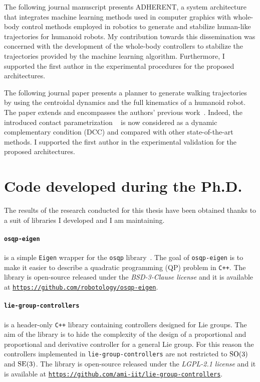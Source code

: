 The following journal manuscript presents ADHERENT, a system architecture that integrates machine learning methods used in computer graphics with whole-body control methods employed in robotics to generate and stabilize human-like trajectories for humanoid robots. My contribution towards this dissemination was concerned with the development of the whole-body controllers to stabilize the trajectories provided by the machine learning algorithm. Furthermore, I supported the first author in the experimental procedures for the proposed architectures.

The following journal paper presents a planner to generate walking trajectories by using the centroidal dynamics and the full kinematics of a humanoid robot. The paper extends and encompasses the authors' previous work~\citep{Dafarra2020Whole-BodyApproach}. Indeed, the introduced contact parametrization ~\citep{Dafarra2020Whole-BodyApproach} is now considered as a dynamic complementary condition (DCC) and compared with other state-of-the-art methods. I supported the first author in the experimental validation for the proposed architectures. 

\section*{Code developed during the Ph.D.}
The results of the research conducted for this thesis have been obtained thanks to a suit of libraries I developed and I am maintaining.
\paragraph{\texttt{osqp-eigen}} is a simple \texttt{Eigen} wrapper for the \texttt{osqp} library~\citep{Stellato2018}. The goal of \texttt{osqp-eigen} is to make it easier to describe a quadratic programming (QP) problem in \texttt{C++}. The library is open-source released under the \emph{BSD-3-Clause license} and it is available at \href{https://github.com/robotology/osqp-eigen}{\texttt{https://github.com/robotology/osqp-eigen}}.

\paragraph{\texttt{lie-group-controllers}} is a header-only \texttt{C++} library containing controllers designed for Lie groups. The aim of the library is to hide the complexity of the design of a proportional and proportional and derivative controller for a general Lie group. For this reason the controllers implemented in \texttt{lie-group-controllers} are not restricted to $\mathrm{SO}(3)$ and ${\mathrm{SE}}(3)$.
The library is open-source released under the \emph{LGPL-2.1 license} and it is available at \href{https://github.com/ami-iit/lie-group-controllers}{\texttt{https://github.com/ami-iit/lie-group-controllers}}.

